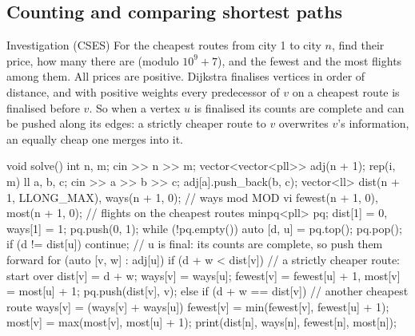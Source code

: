 \subsection{Counting and comparing shortest paths}

\begin{problem}{Investigation (CSES)}
For the cheapest routes from city 1 to city $n$, find their price, how many there are (modulo $10^9 + 7$), and the fewest and
the most flights among them. All prices are positive.
\solution Dijkstra finalises vertices in order of distance, and with positive weights every predecessor of $v$ on a cheapest
route is finalised before $v$. So when a vertex $u$ is finalised its counts are complete and can be pushed along its edges:
a strictly cheaper route to $v$ overwrites $v$'s information, an equally cheap one merges into it.
\end{problem}

\begin{code}
void solve() {
    int n, m;
    cin >> n >> m;
    vector<vector<pll>> adj(n + 1);
    rep(i, m) {
        ll a, b, c;
        cin >> a >> b >> c;
        adj[a].push_back({b, c});
    }
    vector<ll> dist(n + 1, LLONG_MAX), ways(n + 1, 0);  // ways mod MOD
    vi fewest(n + 1, 0), most(n + 1, 0);  // flights on the cheapest routes
    minpq<pll> pq;
    dist[1] = 0, ways[1] = 1;
    pq.push({0, 1});
    while (!pq.empty()) {
        auto [d, u] = pq.top();
        pq.pop();
        if (d != dist[u]) continue;
        // u is final: its counts are complete, so push them forward
        for (auto [v, w] : adj[u]) {
            if (d + w < dist[v]) {  // a strictly cheaper route: start over
                dist[v] = d + w;
                ways[v] = ways[u];
                fewest[v] = fewest[u] + 1, most[v] = most[u] + 1;
                pq.push({dist[v], v});
            } else if (d + w == dist[v]) {  // another cheapest route
                ways[v] = (ways[v] + ways[u]) %
                fewest[v] = min(fewest[v], fewest[u] + 1);
                most[v] = max(most[v], most[u] + 1);
            }
        }
    }
    print(dist[n], ways[n], fewest[n], most[n]);
}
\end{code}

